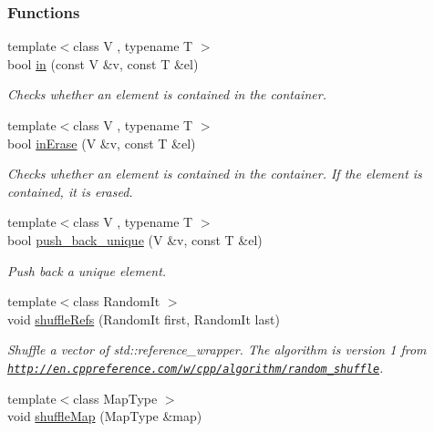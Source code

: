 \subsubsection*{Functions}
\begin{DoxyCompactItemize}
\item 
{\footnotesize template$<$class V , typename T $>$ }\\bool \hyperlink{namespaceslb_1_1core_1_1util_a5aeaa9f908f1b6df7bb9eb67a78de2f8}{in} (const V \&v, const T \&el)
\begin{DoxyCompactList}\small\item\em Checks whether an element is contained in the container. \end{DoxyCompactList}\item 
{\footnotesize template$<$class V , typename T $>$ }\\bool \hyperlink{namespaceslb_1_1core_1_1util_aea02104c8916b2d55097b3a824d68023}{in\+Erase} (V \&v, const T \&el)
\begin{DoxyCompactList}\small\item\em Checks whether an element is contained in the container. If the element is contained, it is erased. \end{DoxyCompactList}\item 
{\footnotesize template$<$class V , typename T $>$ }\\bool \hyperlink{namespaceslb_1_1core_1_1util_a1a96151123c3caa16e91369aa68ed5da}{push\+\_\+back\+\_\+unique} (V \&v, const T \&el)
\begin{DoxyCompactList}\small\item\em Push back a unique element. \end{DoxyCompactList}\item 
{\footnotesize template$<$class Random\+It $>$ }\\void \hyperlink{namespaceslb_1_1core_1_1util_a66d6fd147a0764a6c1c1873e68f336d4}{shuffle\+Refs} (Random\+It first, Random\+It last)
\begin{DoxyCompactList}\small\item\em Shuffle a vector of std\+::reference\+\_\+wrapper. The algorithm is version 1 from \href{http://en.cppreference.com/w/cpp/algorithm/random_shuffle}{\tt http\+://en.\+cppreference.\+com/w/cpp/algorithm/random\+\_\+shuffle}. \end{DoxyCompactList}\item 
{\footnotesize template$<$class Map\+Type $>$ }\\void \hyperlink{namespaceslb_1_1core_1_1util_aca5f759e4a73804fcd828af403904190}{shuffle\+Map} (Map\+Type \&map)

\end{DoxyCompactItemize}
